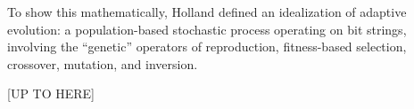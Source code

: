 To show this mathematically, Holland defined an idealization of adaptive evolution: 
a population-based stochastic process
operating on bit strings, involving the ``genetic'' operators of
 reproduction, fitness-based selection, crossover, mutation, and
 inversion.  



[UP TO HERE]